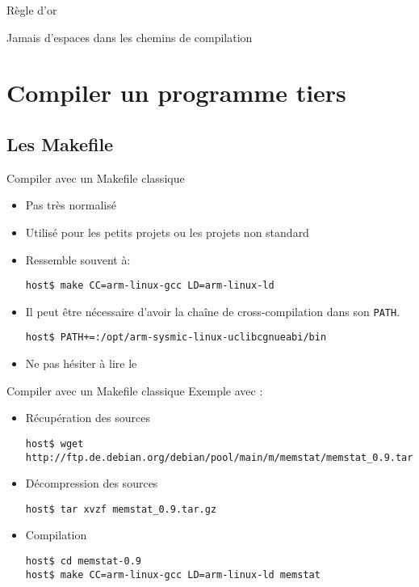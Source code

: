 \begin{frame}[fragile=singleslide]{Règle d'or}
  \begin{center}
    \huge{Jamais d'espaces dans les chemins de compilation}
  \end{center}
\end{frame}

\section{Compiler un programme tiers}

\subsection{Les Makefile}

\begin{frame}[fragile=singleslide]{Compiler avec un Makefile classique}
  \begin{itemize}
  \item Pas très normalisé
  \item Utilisé pour les petits projets ou les projets non standard
  \item Ressemble souvent à:
    \begin{lstlisting}
host$ make CC=arm-linux-gcc LD=arm-linux-ld
    \end{lstlisting} %
  \item Il peut être nécessaire d'avoir la chaîne de cross-compilation
    dans son \verb+PATH+.
    \begin{lstlisting}
host$ PATH+=:/opt/arm-sysmic-linux-uclibcgnueabi/bin
    \end{lstlisting} %
  \item Ne pas hésiter à lire le 
  \end{itemize}
\end{frame}

\begin{frame}[fragile=singleslide]{Compiler avec un Makefile classique}
  Exemple avec :
  \begin{itemize}
  \item Récupération des sources
    \begin{lstlisting}
host$ wget http://ftp.de.debian.org/debian/pool/main/m/memstat/memstat_0.9.tar.gz
    \end{lstlisting}
  \item Décompression des sources
\begin{lstlisting}
host$ tar xvzf memstat_0.9.tar.gz
\end{lstlisting}
  \item Compilation
\begin{lstlisting}
host$ cd memstat-0.9
host$ make CC=arm-linux-gcc LD=arm-linux-ld memstat
\end{lstlisting} %
  \end{itemize}
\end{frame}

